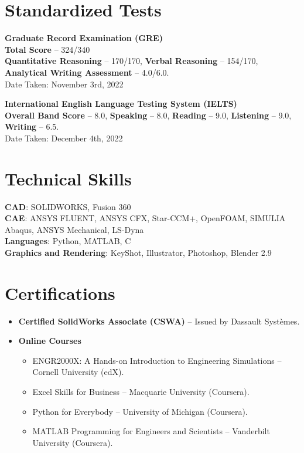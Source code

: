 \documentclass[letterpaper,11pt]{article}
\begin{document}
\section{Standardized Tests}
\begin{itemize}[leftmargin=0in, label={}]
{\item{
\textbf{Graduate Record Examination (GRE)} \\ \textbf{Total Score} – 324/340\\ \textbf{Quantitative Reasoning} – 170/170, \textbf{Verbal Reasoning} – 154/170, \textbf{Analytical Writing Assessment} – 4.0/6.0.\\
Date Taken: November 3rd, 2022
}}
{\item{
{\textbf{International English Language Testing System (IELTS)}\\
\textbf{Overall Band Score} – 8.0, \textbf{Speaking} – 8.0, \textbf{Reading} – 9.0, \textbf{Listening} – 9.0, \textbf{Writing} – 6.5.\\
Date Taken: December 4th, 2022}}}
\end{itemize}

\section{Technical Skills}
\begin{itemize}[leftmargin=0in, label={}]
{\item{
\textbf{CAD}{: SOLIDWORKS, Fusion 360} \\
\textbf{CAE}{: ANSYS FLUENT, ANSYS CFX, Star-CCM+, OpenFOAM, SIMULIA Abaqus, ANSYS Mechanical, LS-Dyna} \\
\textbf{Languages}{: Python, MATLAB, C} \\
\textbf{Graphics and Rendering}{: KeyShot, Illustrator, Photoshop, Blender 2.9} \\
}}
\end{itemize}
\vspace{-16pt}

\section{Certifications}
\begin{itemize}[leftmargin=0.15in]
\item {\textbf{Certified SolidWorks Associate (CSWA)}} – Issued by Dassault Systèmes.
\item \textbf{Online Courses}
\begin{itemize}
\item ENGR2000X: A Hands-on Introduction to Engineering Simulations – Cornell University (edX).
\item Excel Skills for Business – Macquarie University (Coursera).
\item Python for Everybody – University of Michigan (Coursera).
\item MATLAB Programming for Engineers and Scientists – Vanderbilt University (Coursera).
\end{itemize}
\end{itemize}
\end{document}
